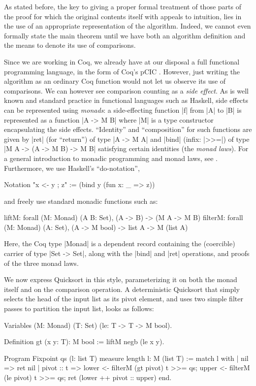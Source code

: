 \documentclass[runningheads]{llncs}
\begin{document}
As stated before, the key to giving a proper formal treatment of those parts of the proof for which the original contents itself with appeals to intuition, lies in the use of an appropriate representation of the algorithm. Indeed, we cannot even formally state the main theorem until we have both an algorithm definition and the means to denote its use of comparisons.

Since we are working in Coq, we already have at our disposal a full functional
programming language, in the form of Coq's pCIC \cite{coq'art}. However, just
writing the algorithm as an ordinary Coq function would not let us observe its
use of comparisons. 
We can however see comparison counting as a \emph{side effect}. As is well
known and standard practice in functional languages such as Haskell, side
effects can be represented using \emph{monads}: a side-effecting function |f|
from |A| to |B| is represented as a function |A -> M B| where |M| is a type
constructor encapsulating the side effects. ``Identity'' and ``composition''
for such functions are given by |ret| (for ``return'') of type |A -> M A| and
|bind| (infix: |>>=|) of type |M A -> (A -> M B) -> M B| satisfying certain
identities (the \emph{monad laws}). For a general introduction to monadic
programming and monad laws, see \cite{wadler93monads}. Furthermore, we use
Haskell's ``do-notation'',
\begin{code}
 Notation "x <- y ; z" := (bind y (fun x: _ => z)) 
\end{code}
and freely use standard monadic functions such as:
\begin{code}
 liftM: forall (M: Monad) (A B: Set), (A -> B) -> (M A -> M B)
 filterM: forall (M: Monad) (A: Set), (A -> M bool) -> list A -> M (list A)
\end{code}
Here, the Coq type |Monad| is a dependent record containing the (coercible) carrier of type |Set
-> Set|, along with the |bind| and |ret| operations, and proofs of the three monad laws. 

We now express Quicksort in this style, parameterizing it on both the monad
itself and on the comparison operation. A deterministic Quicksort that simply selects the head of the input list as its pivot element, and uses two simple filter passes to partition the input list, looks as follows:

\begin{code}
  Variables (M: Monad) (T: Set) (le: T -> T -> M bool).

  Definition gt (x y: T): M bool := liftM negb (le x y).

  Program Fixpoint qs (l: list T) {measure length l}: M (list T) :=
    match l with
    | nil => ret nil
    | pivot :: t =>
        lower <- filterM (gt pivot) t >>= qs;
        upper <- filterM (le pivot) t >>= qs;
        ret (lower ++ pivot :: upper)
    end.
\end{code}
\end{document}
